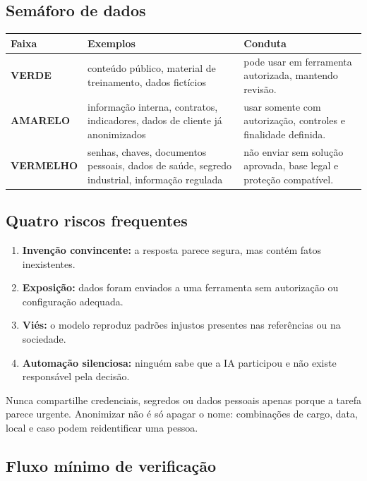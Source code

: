 \documentclass[11pt,a4paper]{article}
\begin{document}
\subsection{Semáforo de dados}

\begin{tabularx}{\linewidth}{>{\bfseries}p{28mm} X X}
\toprule
Faixa & Exemplos & Conduta \\
\midrule
\textcolor{green!50!black}{VERDE} & conteúdo público, material de treinamento, dados fictícios & pode usar em ferramenta autorizada, mantendo revisão. \\
\textcolor{brandgold!80!black}{AMARELO} & informação interna, contratos, indicadores, dados de cliente já anonimizados & usar somente com autorização, controles e finalidade definida. \\
\textcolor{red!70!black}{VERMELHO} & senhas, chaves, documentos pessoais, dados de saúde, segredo industrial, informação regulada & não enviar sem solução aprovada, base legal e proteção compatível. \\
\bottomrule
\end{tabularx}

\subsection{Quatro riscos frequentes}

\begin{enumerate}
  \item \textbf{Invenção convincente:} a resposta parece segura, mas contém fatos inexistentes.
  \item \textbf{Exposição:} dados foram enviados a uma ferramenta sem autorização ou configuração adequada.
  \item \textbf{Viés:} o modelo reproduz padrões injustos presentes nas referências ou na sociedade.
  \item \textbf{Automação silenciosa:} ninguém sabe que a IA participou e não existe responsável pela decisão.
\end{enumerate}

\begin{alerta}
Nunca compartilhe credenciais, segredos ou dados pessoais apenas porque a tarefa parece urgente. Anonimizar não é só apagar o nome: combinações de cargo, data, local e caso podem reidentificar uma pessoa.
\end{alerta}

\newpage
\subsection{Fluxo mínimo de verificação}
\end{document}
